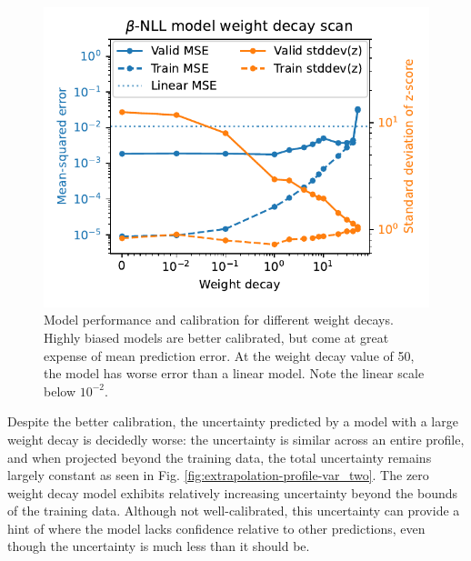 
%
\begin{figure}
	\centering
	\includegraphics[width=\columnwidth]{figures/beta-NLL_wd_model_performance.pdf}
	\caption[size=12]{\label{fig:beta-NLL_wd_model_performance}Model performance and calibration for different weight decays. Highly biased models are better calibrated, but come at great expense of mean prediction error. At the weight decay value of 50, the model has worse error than a linear model. Note the linear scale below $10^{-2}$.}
\end{figure}

Despite the better calibration, the uncertainty predicted by a model with a large weight decay is decidedly worse: the uncertainty is similar across an entire profile, and when projected beyond the training data, the total uncertainty remains largely constant as seen in Fig. \ref{fig:extrapolation-profile-var_two}. The zero weight decay model exhibits relatively increasing uncertainty beyond the bounds of the training data. Although not well-calibrated, this uncertainty can provide a hint of where the model lacks confidence relative to other predictions, even though the uncertainty is much less than it should be.

